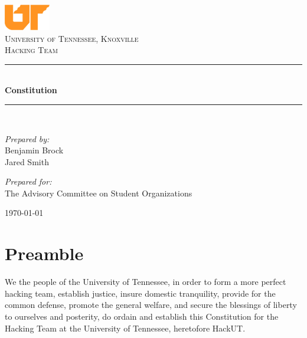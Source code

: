 \documentclass[12pt]{article}
\newcommand{\HRule}{\rule{\linewidth}{0.5mm}}
\begin{document}
\begin{titlepage}
\begin{center}

\includegraphics[width=0.15\textwidth]{utlogo-large.jpg}~\\[1cm]

\textsc{\LARGE University of Tennessee, Knoxville}\\[1.5cm]

\textsc{\Large Hacking Team}\\[0.5cm]

\HRule \\[0.4cm]
{ \huge \bfseries Constitution \\[0.4cm] }

\HRule \\[1.5cm]

\begin{minipage}{0.4\textwidth}
\begin{flushleft} \large
\emph{Prepared by:}\\
Benjamin Brock \\ Jared Smith
\end{flushleft}
\end{minipage}
\begin{minipage}{0.4\textwidth}
\begin{flushright} \large
\emph{Prepared for:} \\
The Advisory Committee on Student Organizations
\end{flushright}
\end{minipage}

\vfill

{\large \today}

\end{center}
\end{titlepage}

\section*{Preamble}
We the people of the University of Tennessee, in order to form a more perfect hacking team, establish justice, insure domestic tranquility, provide for the common defense, promote the general welfare, and secure the blessings of liberty to ourselves and posterity, do ordain and establish this Constitution for the Hacking Team at the University of Tennessee, heretofore HackUT.
\end{document}
